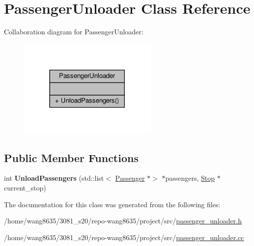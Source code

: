 \hypertarget{classPassengerUnloader}{}\section{Passenger\+Unloader Class Reference}
\label{classPassengerUnloader}


Collaboration diagram for Passenger\+Unloader\+:
\nopagebreak
\begin{figure}[H]
\begin{center}
\leavevmode
\includegraphics[width=194pt]{classPassengerUnloader__coll__graph}
\end{center}
\end{figure}
\subsection*{Public Member Functions}
\begin{DoxyCompactItemize}
\item 
\mbox{\label{classPassengerUnloader_a571ee51523a6bce30fb843174eaad4a2}} 
int {\bfseries Unload\+Passengers} (std\+::list$<$ \hyperlink{classPassenger}{Passenger} $\ast$$>$ $\ast$passengers, \hyperlink{classStop}{Stop} $\ast$current\+\_\+stop)
\end{DoxyCompactItemize}


The documentation for this class was generated from the following files\+:\begin{DoxyCompactItemize}
\item 
/home/wang8635/3081\+\_\+s20/repo-\/wang8635/project/src/\hyperlink{passenger__unloader_8h}{passenger\+\_\+unloader.\+h}\item 
/home/wang8635/3081\+\_\+s20/repo-\/wang8635/project/src/\hyperlink{passenger__unloader_8cc}{passenger\+\_\+unloader.\+cc}\end{DoxyCompactItemize}

